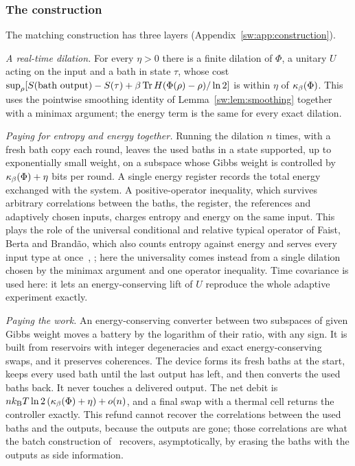 \subsubsection{The construction}

The matching construction has three layers (Appendix~\ref{sw:app:construction}).

\emph{A real-time dilation.} For every $\eta>0$ there is a finite dilation of $\Phi$, a unitary $U$ acting on the input and a bath in state $\tau$, whose cost $\sup_\rho[S(\text{bath output})-S(\tau)+\beta\operatorname{Tr} H(\Phi(\rho)-\rho)/\ln2]$ is within $\eta$ of $\kappa_\beta(\Phi)$. This uses the pointwise smoothing identity of Lemma~\ref{sw:lem:smoothing} together with a minimax argument; the energy term is the same for every exact dilation.

\emph{Paying for entropy and energy together.} Running the dilation $n$ times, with a fresh bath copy each round, leaves the used baths in a state supported, up to exponentially small weight, on a subspace whose Gibbs weight is controlled by $\kappa_\beta(\Phi)+\eta$ bits per round. A single energy register records the total energy exchanged with the system. A positive-operator inequality, which survives arbitrary correlations between the baths, the register, the references and adaptively chosen inputs, charges entropy and energy on the same input. This plays the role of the universal conditional and relative typical operator of Faist, Berta and Brand\~ao, which also counts entropy against energy and serves every input type at once~\cite{FBB19}, \cite[Sec.~6]{FBB21}; here the universality comes instead from a single dilation chosen by the minimax argument and one operator inequality. Time covariance is used here: it lets an energy-conserving lift of $U$ reproduce the whole adaptive experiment exactly.

\emph{Paying the work.} An energy-conserving converter between two subspaces of given Gibbs weight moves a battery by the logarithm of their ratio, with any sign. It is built from reservoirs with integer degeneracies and exact energy-conserving swaps, and it preserves coherences. The device forms its fresh baths at the start, keeps every used bath until the last output has left, and then converts the used baths back. It never touches a delivered output. The net debit is $nk_{\mathrm B} T\ln2\,(\kappa_\beta(\Phi)+\eta)+o(n)$, and a final swap with a thermal cell returns the controller exactly. This refund cannot recover the correlations between the used baths and the outputs, because the outputs are gone; those correlations are what the batch construction of~\cite[Sec.~7]{FBB21} recovers, asymptotically, by erasing the baths with the outputs as side information.

